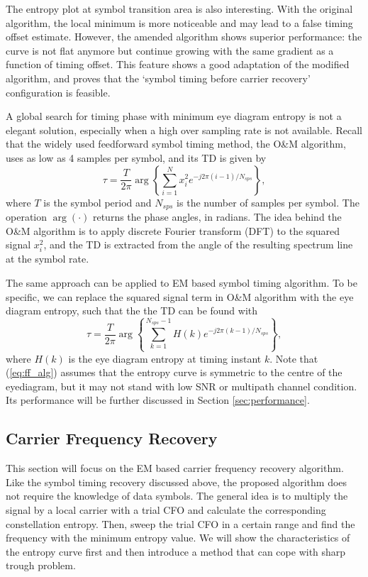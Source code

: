 \documentclass[journal,comsoc]{IEEEtran}
\begin{document}
The entropy plot at symbol transition area is also interesting.
With the original algorithm, the local minimum is more noticeable and may lead to a false timing offset estimate.
However, the amended algorithm shows superior performance:
the curve is not flat anymore but continue growing with the same gradient as a function of timing offset.
This feature shows a good adaptation of the modified algorithm, and proves that the `symbol timing before carrier recovery' configuration is feasible.

A global search for timing phase with minimum eye diagram entropy is not a elegant solution, especially when a high over sampling rate is not available.
Recall that the widely used feedforward symbol timing method, the O\&M algorithm, uses as low as 4 samples per symbol, and its TD is given by
\begin{equation}
\tau=\frac{T}{2\pi}\arg \left\{ {\sum\limits_{i = 1}^{N} {x_i^2{e^{ - j2\pi (i-1)/N_{sps}}}} } \right\},
\end{equation}
where \(T\) is the symbol period and \(N_{sps}\) is the number of samples per symbol.
The operation \(\arg( \cdot )\) returns the phase angles, in radians.
The idea behind the O\&M algorithm is to apply discrete Fourier transform (DFT) to the squared signal \(x_i^2\),
and the TD is extracted from the angle of the resulting spectrum line at the symbol rate.

The same approach can be applied to EM based symbol timing algorithm.
To be specific, we can replace the squared signal term in O\&M algorithm with the eye diagram entropy,
such that the the TD can be found with
\begin{equation}
\tau  = \frac{T}{{2\pi }}\arg \left\{ {\sum\limits_{k = 1}^{N_{sps}-1} {H(k){e^{ - j2\pi (k-1)/N_{sps}}}} } \right\},
\label{eq:ff_alg}
\end{equation}
where \(H(k)\) is the eye diagram entropy at timing instant \(k\).
Note that (\ref{eq:ff_alg}) assumes that the entropy curve is symmetric to the centre of the eyediagram,
but it may not stand with low SNR or multipath channel condition.
Its performance will be further discussed in Section \ref{sec:performance}.

\subsection{Carrier Frequency Recovery}
This section will focus on the EM based carrier frequency recovery algorithm.
Like the symbol timing recovery discussed above, the proposed algorithm does not require the knowledge of data symbols.
The general idea is to multiply the signal by a local carrier with a trial CFO and calculate the corresponding constellation entropy.
Then, sweep the trial CFO in a certain range and find the frequency with the minimum entropy value.
We will show the characteristics of the entropy curve first and then introduce a method that can cope with sharp trough problem.
\end{document}
